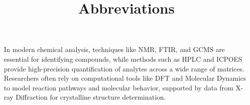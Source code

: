 \documentclass[a4paper,twoside]{article}
\title{Abbreviations}
\author{}\date{}
\begin{document}
\maketitle

\thispagestyle{plain}
In modern chemical analysis, techniques like \acrshort{NMR}, \acrshort{FTIR}, and \acrshort{GCMS} are essential for identifying compounds, while methods such as \acrshort{HPLC} and \acrshort{ICPOES} provide high-precision quantification of analytes across a wide range of matrices. Researchers often rely on computational tools like \acrshort{DFT} and Molecular Dynamics to model reaction pathways and molecular behavior, supported by data from X-ray Diffraction for crystalline structure determination.

\printglossary[type=\acronymtype]
\end{document}

